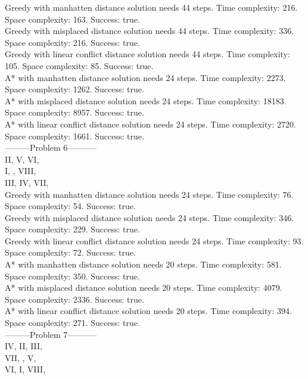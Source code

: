\documentclass[paper=a4, fontsize=11pt]{scrartcl} %
\numberwithin{equation}{section} %
\numberwithin{figure}{section} %
\numberwithin{table}{section} %
\begin{document}
Greedy with manhatten distance solution needs 44 steps. Time complexity: 216. Space complexity: 163. Success: true.\\ 
Greedy with misplaced distance solution needs 44 steps. Time complexity: 336. Space complexity: 216. Success: true.\\ 
Greedy with linear conflict distance solution needs 44 steps. Time complexity: 105. Space complexity: 85. Success: true.\\ 
A* with manhatten distance solution needs 24 steps. Time complexity: 2273. Space complexity: 1262. Success: true.\\ 
A* with misplaced distance solution needs 24 steps. Time complexity: 18183. Space complexity: 8957. Success: true.\\ 
A* with linear conflict distance solution needs 24 steps. Time complexity: 2720. Space complexity: 1661. Success: true.\\ 
---------Problem 6-----------\\ 
II, V, VI, \\ 
I, , VIII, \\ 
III, IV, VII, \\ 

Greedy with manhatten distance solution needs 24 steps. Time complexity: 76. Space complexity: 54. Success: true.\\ 
Greedy with misplaced distance solution needs 24 steps. Time complexity: 346. Space complexity: 229. Success: true.\\ 
Greedy with linear conflict distance solution needs 24 steps. Time complexity: 93. Space complexity: 72. Success: true.\\ 
A* with manhatten distance solution needs 20 steps. Time complexity: 581. Space complexity: 350. Success: true.\\ 
A* with misplaced distance solution needs 20 steps. Time complexity: 4079. Space complexity: 2336. Success: true.\\ 
A* with linear conflict distance solution needs 20 steps. Time complexity: 394. Space complexity: 271. Success: true.\\ 
---------Problem 7-----------\\ 
IV, II, III, \\ 
VII, , V, \\ 
VI, I, VIII, \\ 
\end{document}
